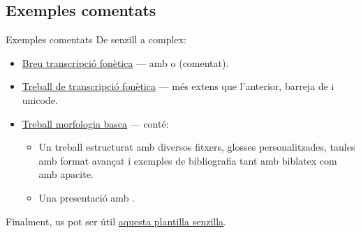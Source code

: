 \subsection{Exemples comentats}\label{sec:exemples_comentats}
\begin{frame}{Exemples comentats}
De senzill a complex:
\begin{itemize}
    \item \href{https://www.overleaf.com/read/rgxbsfvqsgbw\#ba04b9}{Breu transcripció fonètica} --- amb  o  (comentat).
    \item \href{https://www.overleaf.com/read/mxysfjcnnppm\#294a25}{Treball de transcripció fonètica} --- més extens que l'anterior, barreja de  i unicode.
    \item \href{https://www.overleaf.com/read/sxkcdfrpmbcb\#10abd3}{Treball morfologia basca} --- conté:
\begin{itemize}
    \item Un treball estructurat amb diversos fitxers, glosses personalitzades, taules amb format avançat i exemples de bibliografia tant amb biblatex com amb apacite.
    \item Una presentació amb .
\end{itemize}
\end{itemize}

Finalment, us pot ser útil \href{https://www.overleaf.com/read/vsdvmbzywdrn\#d43fce}{aquesta plantilla senzilla}.

\end{frame}

